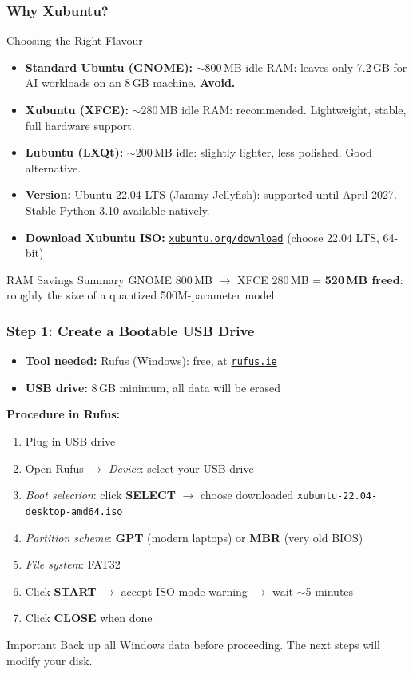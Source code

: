 \begin{frame}[fragile]\frametitle{Why Xubuntu? }

Choosing the Right Flavour

\begin{itemize}
  \item \textbf{Standard Ubuntu (GNOME):} $\sim$800\,MB idle RAM: leaves only 7.2\,GB for AI workloads on an 8\,GB machine. \textbf{Avoid.}
  \item \textbf{Xubuntu (XFCE):} $\sim$280\,MB idle RAM: recommended. Lightweight, stable, full hardware support.
  \item \textbf{Lubuntu (LXQt):} $\sim$200\,MB idle: slightly lighter, less polished. Good alternative.
  \item \textbf{Version:} Ubuntu 22.04 LTS (Jammy Jellyfish): supported until April 2027. Stable Python 3.10 available natively.
  \item \textbf{Download Xubuntu ISO:} \href{https://xubuntu.org/download/}{\texttt{xubuntu.org/download}} (choose 22.04 LTS, 64-bit)
\end{itemize}
\begin{block}{RAM Savings Summary}
GNOME 800\,MB $\rightarrow$ XFCE 280\,MB = \textbf{520\,MB freed}: roughly the size of a quantized 500M-parameter model
\end{block}
\end{frame}

\begin{frame}[fragile]\frametitle{Step 1: Create a Bootable USB Drive}
\begin{itemize}
  \item \textbf{Tool needed:} Rufus (Windows): free, at \href{https://rufus.ie}{\texttt{rufus.ie}}
  \item \textbf{USB drive:} 8\,GB minimum, all data will be erased
\end{itemize}
\vspace{0.3em}
\textbf{Procedure in Rufus:}
\begin{enumerate}
  \item Plug in USB drive
  \item Open Rufus $\rightarrow$ \textit{Device}: select your USB drive
  \item \textit{Boot selection}: click \textbf{SELECT} $\rightarrow$ choose downloaded \texttt{xubuntu-22.04-desktop-amd64.iso}
  \item \textit{Partition scheme}: \textbf{GPT} (modern laptops) or \textbf{MBR} (very old BIOS)
  \item \textit{File system}: FAT32
  \item Click \textbf{START} $\rightarrow$ accept ISO mode warning $\rightarrow$ wait $\sim$5 minutes
  \item Click \textbf{CLOSE} when done
\end{enumerate}
\begin{alertblock}{Important}
Back up all Windows data before proceeding. The next steps will modify your disk.
\end{alertblock}
\end{frame}

